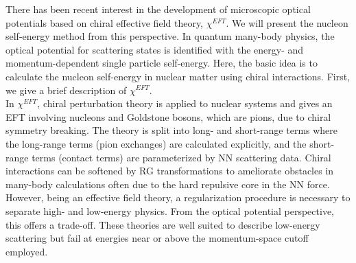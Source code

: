 \documentclass[preprintnumbers,floatfix,aps,prc,preprint,nofootinbib]{revtex4-1}
\begin{document}
There has been recent interest in the development of microscopic optical potentials based on chiral effective field theory, $\chi^{EFT}$. We will present the nucleon self-energy method from this perspective. In quantum many-body physics, the optical potential for scattering states is identified with the energy- and momentum-dependent single particle self-energy. Here, the basic idea is to calculate the nucleon self-energy in nuclear matter using chiral interactions. First, we give a brief description of $\chi^{EFT}$.
\\

In $\chi^{EFT}$, chiral perturbation theory is applied to nuclear systems and gives an EFT involving nucleons and Goldstone bosons, which are pions, due to chiral symmetry breaking. The theory is split into long- and short-range terms where the long-range terms (pion exchanges) are calculated explicitly, and the short-range terms (contact terms) are parameterized by NN scattering data. Chiral interactions can be softened by RG transformations to ameliorate obstacles in many-body calculations often due to the hard repulsive core in the NN force. However, being an effective field theory, a regularization procedure is necessary to separate high- and low-energy physics. From the optical potential perspective, this offers a trade-off. These theories are well suited to describe low-energy scattering but fail at energies near or above the momentum-space cutoff employed.
\\
\end{document}
